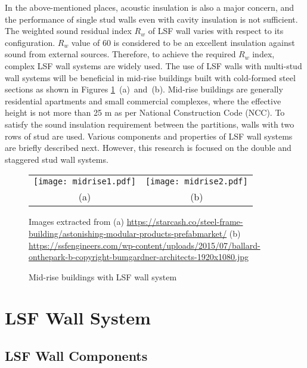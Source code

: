 In the above-mentioned places, acoustic insulation is also a major concern, and the performance of single stud walls even with cavity insulation is not sufficient. The weighted sound residual index $R_w$ of LSF wall varies with respect to its configuration. $R_w$ value of 60 is considered to be an excellent insulation against sound from external sources. Therefore, to achieve the required $R_w$ index, complex LSF wall systems are widely used. The use of LSF walls with multi-stud wall systems will be beneficial in mid-rise buildings built with cold-formed steel sections as shown in Figures \ref{fig:midrise}~(a)~and~(b). Mid-rise buildings are generally residential apartments and small commercial complexes, where the effective height is not more than 25 m as per National Construction Code (NCC). To satisfy the sound insulation requirement between the partitions, walls with two rows of stud are used. Various components and properties of LSF wall systems are briefly described next. However, this research is focused on the double and staggered stud wall systems.
	 
\begin{figure}[htbp]
	\centering	
		\begin{tabular}{cc}
			\texttt{[image: midrise1.pdf]} &
			\texttt{[image: midrise2.pdf]} \\
			(a) &
			(b) \\
		\end{tabular}
		\begin{scriptsize}
			Images extracted from (a) \url{https://starcash.co/steel-frame-building/astonishing-modular-products-prefabmarket/} (b) \url{https://ssfengineers.com/wp-content/uploads/2015/07/ballard-onthepark-b-copyright-bumgardner-architects-1920x1080.jpg}
			\end{scriptsize}	
		\caption{Mid-rise buildings with LSF wall system}
		\label{fig:midrise}
\end{figure}

\section{LSF Wall System}
\subsection{LSF Wall Components}

